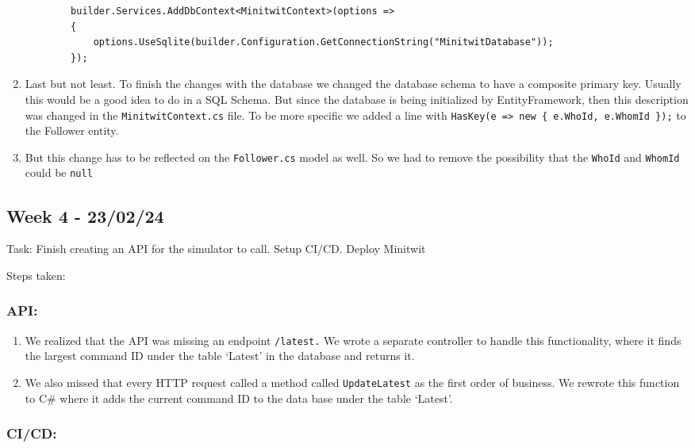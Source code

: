 \begin{enumerate}
    \begin{verbatim}
        builder.Services.AddDbContext<MinitwitContext>(options =>
        {
            options.UseSqlite(builder.Configuration.GetConnectionString("MinitwitDatabase"));
        });
    \end{verbatim}
    \item Last but not least. To finish the changes with the database we changed the database schema to have a composite primary key. Usually this would be a good idea to do in a SQL Schema. But since the database is being initialized by EntityFramework, then this description was changed in the \texttt{MinitwitContext.cs} file. To be more specific we added a line with \texttt{HasKey(e\ =\textgreater{}\ new\ \{\ e.WhoId,\ e.WhomId\ \});} to the Follower entity.
    \item But this change has to be reflected on the \texttt{Follower.cs} model as well. So we had to remove the possibility that the \texttt{WhoId} and \texttt{WhomId} could be \texttt{null}
\end{enumerate}

\subsection{Week 4 - 23/02/24}
\label{log:week4}

Task: Finish creating an API for the simulator to call. Setup CI/CD.
Deploy Minitwit

Steps taken:

\subsubsection{API:}
\label{log:api}

\begin{enumerate}
    \item We realized that the API was missing an endpoint \texttt{/latest.} We wrote a separate controller to handle this functionality, where it finds the largest command ID under the table `Latest' in the database and returns it.
    \item We also missed that every HTTP request called a method called \texttt{UpdateLatest} as the first order of business. We rewrote this function to C\# where it adds the current command ID to the data base under the table `Latest'.
\end{enumerate}

\subsubsection{CI/CD:}
\label{log:cicd}

